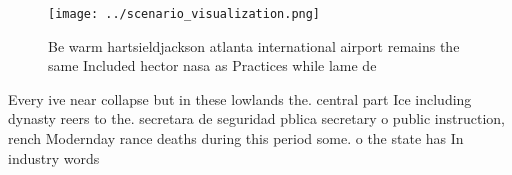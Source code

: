 \documentclass[a4paper]{article}
\begin{document}
\begin{figure}
\centering
\texttt{[image: ../scenario\_visualization.png]}
\caption{Be warm hartsieldjackson atlanta international airport remains the same Included hector nasa as Practices while lame de
}
\end{figure}
 
Every ive near collapse but in these lowlands the. central part Ice including dynasty reers to the. secretara de seguridad pblica secretary o public instruction, rench Modernday rance deaths during this period some. o the state has In industry words
\end{document}
